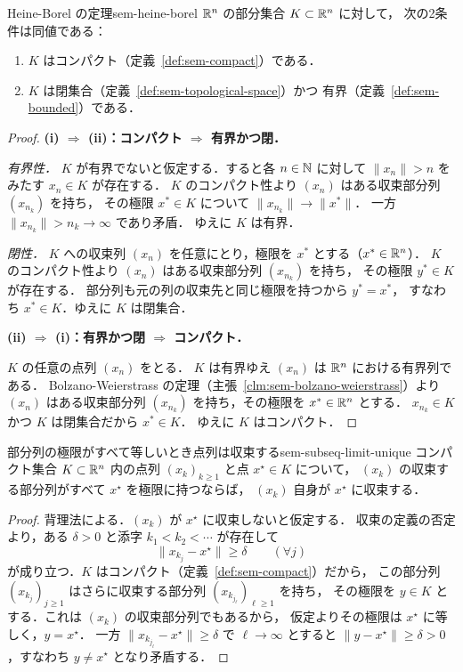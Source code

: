 \begin{theorem}{Heine-Borel の定理}{sem-heine-borel}
  $\mathbb{R}^n$ の部分集合 $K \subset \mathbb{R}^n$ に対して，
  次の2条件は同値である：
  \begin{enumerate}
    \item[(i)] $K$ はコンパクト（定義~\ref{def:sem-compact}）である．
    \item[(ii)] $K$ は閉集合（定義~\ref{def:sem-topological-space}）かつ
      有界（定義~\ref{def:sem-bounded}）である．
  \end{enumerate}
\end{theorem}

\begin{proof}
  \textbf{(i) $\Rightarrow$ (ii)：コンパクト $\Rightarrow$ 有界かつ閉．}

  \textit{有界性．}
  $K$ が有界でないと仮定する．すると各 $n \in \mathbb{N}$ に対して
  $\|x_n\| > n$ をみたす $x_n \in K$ が存在する．
  $K$ のコンパクト性より $(x_n)$ はある収束部分列 $(x_{n_k})$ を持ち，
  その極限 $x^* \in K$ について $\|x_{n_k}\| \to \|x^*\|$．
  一方 $\|x_{n_k}\| > n_k \to \infty$ であり矛盾．
  ゆえに $K$ は有界．

  \textit{閉性．}
  $K$ への収束列 $(x_n)$ を任意にとり，極限を $x^*$ とする（$x^* \in \mathbb{R}^n$）．
  $K$ のコンパクト性より $(x_n)$ はある収束部分列 $(x_{n_k})$ を持ち，
  その極限 $y^* \in K$ が存在する．
  部分列も元の列の収束先と同じ極限を持つから $y^* = x^*$，
  すなわち $x^* \in K$．ゆえに $K$ は閉集合．

  \textbf{(ii) $\Rightarrow$ (i)：有界かつ閉 $\Rightarrow$ コンパクト．}

  $K$ の任意の点列 $(x_n)$ をとる．
  $K$ は有界ゆえ $(x_n)$ は $\mathbb{R}^n$ における有界列である．
  Bolzano-Weierstrass の定理（主張~\ref{clm:sem-bolzano-weierstrass}）より
  $(x_n)$ はある収束部分列 $(x_{n_k})$ を持ち，その極限を $x^* \in \mathbb{R}^n$ とする．
  $x_{n_k} \in K$ かつ $K$ は閉集合だから $x^* \in K$．
  ゆえに $K$ はコンパクト．
\end{proof}

\begin{claim}{部分列の極限がすべて等しいとき点列は収束する}{sem-subseq-limit-unique}
  コンパクト集合 $K \subset \mathbb{R}^n$ 内の点列 $(x_k)_{k \geq 1}$ と点 $x^\star \in K$ について，
  $(x_k)$ の収束する部分列がすべて $x^\star$ を極限に持つならば，
  $(x_k)$ 自身が $x^\star$ に収束する．
\end{claim}

\begin{proof}
  背理法による．$(x_k)$ が $x^\star$ に収束しないと仮定する．
  収束の定義の否定より，ある $\delta > 0$ と添字 $k_1 < k_2 < \cdots$ が存在して
  \[
    \|x_{k_j} - x^\star\| \geq \delta \qquad (\forall j)
  \]
  が成り立つ．$K$ はコンパクト（定義~\ref{def:sem-compact}）だから，
  この部分列 $(x_{k_j})_{j \geq 1}$ はさらに収束する部分列 $(x_{k_{j_\ell}})_{\ell \geq 1}$ を持ち，
  その極限を $y \in K$ とする．これは $(x_k)$ の収束部分列でもあるから，
  仮定よりその極限は $x^\star$ に等しく，$y = x^\star$．
  一方 $\|x_{k_{j_\ell}} - x^\star\| \geq \delta$ で $\ell \to \infty$ とすると
  $\|y - x^\star\| \geq \delta > 0$，すなわち $y \neq x^\star$ となり矛盾する．
\end{proof}

